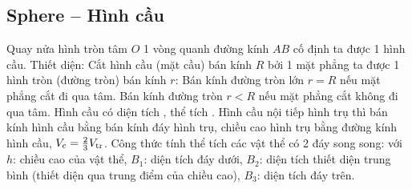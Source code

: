 \documentclass{article}
\begin{document}
\subsection{Sphere -- Hình cầu}
 Quay nửa hình tròn tâm $O$ 1 vòng quanh đường kính $AB$ cố định ta được 1 hình cầu.  {\sf Thiết diện}: Cắt hình cầu (mặt cầu) bán kính $R$ bởi 1 mặt phẳng ta được 1 hình tròn (đường tròn) bán kính $r$: Bán kính đường tròn lớn $r = R$ nếu mặt phẳng cắt đi qua tâm. Bán kính đường tròn $r < R$ nếu mặt phẳng cắt không đi qua tâm.  Hình cầu có diện tích , thể tích .  Hình cầu nội tiếp hình trụ thì bán kính hình cầu bằng bán kính đáy hình trụ, chiều cao hình trụ bằng đường kính hình cầu, $V_{\rm c} = \frac{2}{3}V_{\rm tr}$.  Công thức tính thể tích các vật thể có 2 đáy song song:  với $h$: chiều cao của vật thể, $B_1$: diện tích đáy dưới, $B_2$: diện tích thiết diện trung bình (thiết diện qua trung điểm của chiều cao), $B_3$: diện tích đáy trên.


\printbibliography[heading=bibintoc]
	
\end{document}

